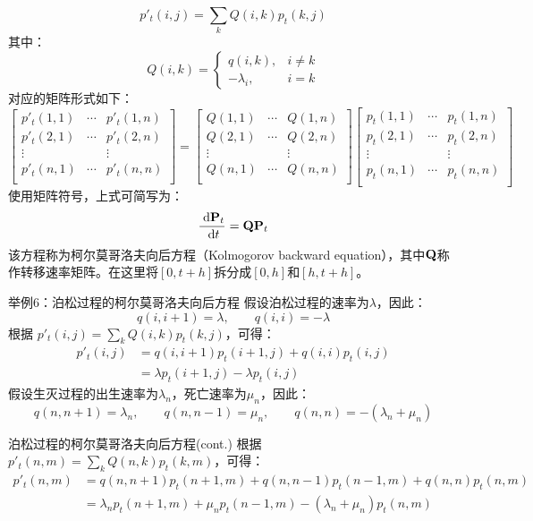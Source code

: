 \documentclass[t]{beamer}
\newcommand{\dif}{{\;\rm d}}
\begin{document}
    \begin{frame}{}\small
      \[p'_t(i,j)=\sum_k Q(i,k)p_t(k,j)\]
    其中：
    \[Q(i,k)=\begin{cases}
    q(i,k), & i\ne k\\
    -\lambda_i, & i=k
    \end{cases}\]
    对应的矩阵形式如下：
    \[\begin{bmatrix}
    p'_t(1,1)& \cdots &p'_t(1,n)\\
    p'_t(2,1)& \cdots &p'_t(2,n)\\
    \vdots&  &\vdots\\
    p'_t(n,1)& \cdots &p'_t(n,n)\\
    \end{bmatrix}=
    \begin{bmatrix}
    Q(1,1)& \cdots &Q(1,n)\\
    Q(2,1)& \cdots &Q(2,n)\\
    \vdots&  &\vdots\\
    Q(n,1)& \cdots &Q(n,n)\\
    \end{bmatrix}\begin{bmatrix}
    p_t(1,1)& \cdots &p_t(1,n)\\
    p_t(2,1)& \cdots &p_t(2,n)\\
    \vdots&  &\vdots\\
    p_t(n,1)& \cdots &p_t(n,n)\\
    \end{bmatrix}
     \]
     使用矩阵符号，上式可简写为：
     \[\frac{\dif {\bf P}_t}{\dif t}={\bf Q}{\bf P}_t \]
     该方程称为柯尔莫哥洛夫向后方程（Kolmogorov backward equation），其中${\bf Q}$称作{转移速率矩阵}。在这里将$[0,t+h]$拆分成$[0,h]$和$[h,t+h]$。
\end{frame}

\begin{frame}{举例6：泊松过程的柯尔莫哥洛夫向后方程}
  假设泊松过程的速率为$\lambda$，因此：
  \[q(i,i+1)=\lambda,\qquad q(i,i)=-\lambda \]
  根据
  $p'_t(i,j)=\sum_k Q(i,k)p_t(k,j)$，可得：
  \[\begin{split}
  p'_t(i,j)&=q(i,i+1)p_t(i+1,j)+q(i,i)p_t(i,j)\\
  &=\lambda p_t(i+1,j)-\lambda p_t(i,j)
  \end{split} \]
  假设生灭过程的出生速率为$\lambda_n$，死亡速率为$\mu_n$，因此：
\[q(n,n+1)=\lambda_n,\qquad q(n,n-1)=\mu_n,\qquad q(n,n)=-(\lambda_n+\mu_n) \]
\end{frame}

\begin{frame}{泊松过程的柯尔莫哥洛夫向后方程(cont.)}
根据
$p'_t(n,m)=\sum_k Q(n,k)p_t(k,m)$，可得：
\[\begin{split}
p'_t(n,m)&=q(n,n+1)p_t(n+1,m)+q(n,n-1)p_t(n-1,m)+q(n,n)p_t(n,m)\\
&=\lambda_n p_t(n+1,m)+\mu_n p_t(n-1,m)-(\lambda_n+\mu_n)p_t(n,m)
\end{split} \]	
\end{frame}
\end{document}
